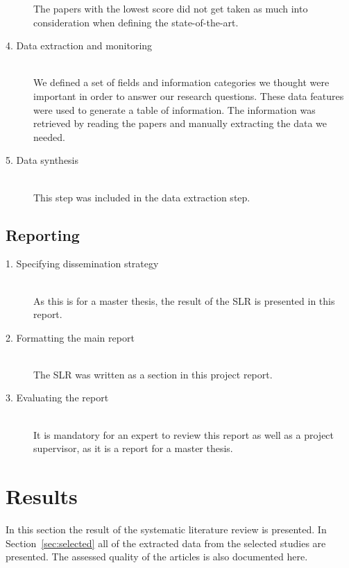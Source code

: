 \begin{description}
		The papers with the lowest score did not get taken as much into consideration when defining the state-of-the-art. 
		
	\item[4. Data extraction and monitoring] \hfill \\
		We defined a set of fields and information categories we thought were important in order to answer our research questions. These data features were used to generate a table of information. The information was retrieved by reading the papers and manually extracting the data we needed.
	

	\item[5. Data synthesis] \hfill \\
		This step was included in the data extraction step.
\end{description}


\subsection{Reporting}


\begin{description}

	\item[1. Specifying dissemination strategy] \hfill \\
		As this is for a master thesis, the result of the SLR is presented in this report.  

	\item[2. Formatting the main report] \hfill \\
		The SLR was written as a section in this project report. 

	\item[3. Evaluating the report] \hfill \\
		It is mandatory for an expert to review this report as well as a project supervisor, as it is a report for a master thesis.

\end{description}

\section{Results}
\label{sec:slrresults}

In this section the result of the systematic literature review is presented. In Section~\ref{sec:selected} all of the extracted data from the selected studies are presented. The assessed quality of the articles is also documented here.

